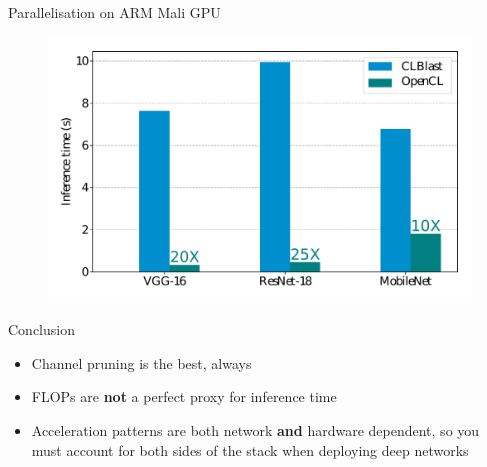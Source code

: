 \documentclass[xcolor=dvipsnames]{beamer}
\begin{document}
\begin{frame}{Parallelisation on ARM Mali GPU}
    

    \begin{figure}
        \centering
        \includegraphics[width=\linewidth]{images/Odroid-GPU.pdf}
        \label{fig:odroid-gpu}
    \end{figure}
    
\end{frame}



\begin{frame}{Conclusion}
    
    \begin{itemize}
        \item Channel pruning is the best, always
        \item FLOPs are \textbf{not} a perfect proxy for inference time
        \item Acceleration patterns are both network \textbf{and} hardware dependent, so you must account for both sides of the stack when deploying deep networks 
    \end{itemize}
    
\end{frame}
\end{document}
